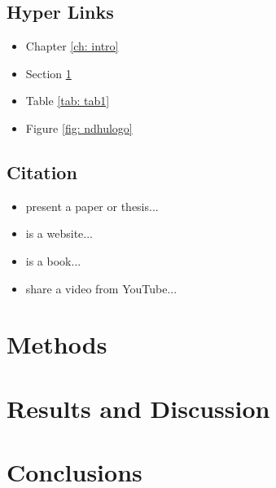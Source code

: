 \documentclass[12pt,a4paper,oneside]{book}
\begin{document}
\newpage
\section{Hyper Links}
\label{sec: link}

\begin{itemize}
    \item Chapter \ref{ch: intro}
    \item Section \ref{sec: link}
    \item Table \ref{tab: tab1}
    \item Figure \ref{fig: ndhulogo}
\end{itemize}

\section{Citation}

\begin{itemize}
    \item \cite{lu2023art} present a paper or thesis...
    \item \cite{lu2023misc} is a website...
    \item \cite{lu2023book} is a book...
    \item \cite{lu2023online} share a video from YouTube...
\end{itemize}

\chapter{Methods}

\chapter{Results and Discussion}

\chapter{Conclusions}

\newpage

\printbibliography[title={References}, heading=bibintoc]

\newpage

\appendix 
\chapter{}
\end{document}
